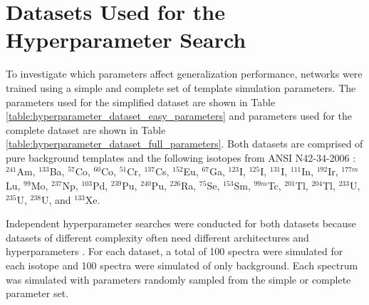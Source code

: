 

\section{Datasets Used for the Hyperparameter Search}

To investigate which parameters affect generalization performance, networks were trained using a simple and complete set of template simulation parameters. The parameters used for the simplified dataset are shown in Table \ref{table:hyperparameter_dataset_easy_parameters} and parameters used for the complete dataset are shown in Table \ref{table:hyperparameter_dataset_full_parameters}. Both datasets are comprised of pure background templates and the following isotopes from ANSI N42-34-2006 \cite{ANSI}: $^{241}$Am, $^{133}$Ba, $^{57}$Co, $^{60}$Co, $^{51}$Cr, $^{137}$Cs, $^{152}$Eu, $^{67}$Ga, $^{123}$I, $^{125}$I, $^{131}$I, $^{111}$In, $^{192}$Ir, $^{177m}$Lu, $^{99}$Mo, $^{237}$Np, $^{103}$Pd, $^{239}$Pu, $^{240}$Pu, $^{226}$Ra, $^{75}$Se, $^{153}$Sm, $^{99m}$Tc, $^{201}$Tl, $^{204}$Tl, $^{233}$U, $^{235}$U, $^{238}$U, and $^{133}$Xe.

Independent hyperparameter searches were conducted for both datasets because datasets of different complexity often need different architectures and hyperparameters \cite{Bergstra2012}. For each dataset, a total of 100 spectra were simulated for each isotope and 100 spectra were simulated of only background. Each spectrum was simulated with parameters randomly sampled from the simple or complete parameter set.

